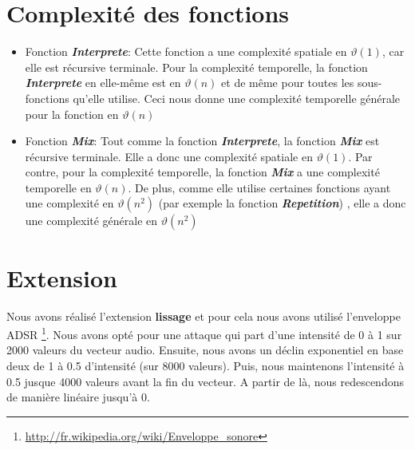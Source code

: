 \documentclass[a4paper,12pt]{report}
\begin{document}
\section*{Complexité des fonctions}
\begin{itemize}


\item Fonction \textit{\textbf{Interprete}}: Cette fonction a une complexité spatiale en $\vartheta(1)$, car elle est récursive terminale.
Pour la complexité temporelle, la fonction \textit{\textbf {Interprete}} en elle-même est en  $\vartheta(n)$ et de même pour toutes les sous-fonctions qu'elle utilise. Ceci nous donne une complexité temporelle  générale pour la fonction en  $\vartheta(n)$
\item Fonction \textit{\textbf{Mix}}: Tout comme la fonction \textit{\textbf{Interprete}}, la fonction \textit{\textbf{Mix}} est récursive terminale. Elle a donc une complexité spatiale en  $\vartheta(1)$. Par contre, pour la complexité temporelle, la fonction \textit{\textbf{Mix}} a une complexité temporelle en  $\vartheta(n)$. De plus, comme elle utilise certaines fonctions ayant une complexité en  $\vartheta(n^2)$ (par exemple la fonction \textit{\textbf{Repetition}}) , elle a donc une complexité générale en  $\vartheta(n^2)$

\end{itemize} 


\section*{Extension}
Nous avons réalisé l'extension {\large \textbf{lissage}} et pour cela nous avons utilisé l'enveloppe ADSR \footnote{\url{http://fr.wikipedia.org/wiki/Enveloppe_sonore}}. Nous avons opté pour une attaque qui part d'une intensité de 0 à 1 sur 2000 valeurs du vecteur audio. Ensuite, nous avons un déclin exponentiel en base deux de 1 à 0.5 d'intensité (sur 8000 valeurs). Puis, nous maintenons l'intensité à 0.5 jusque 4000 valeurs avant la fin du vecteur. A partir de là, nous redescendons de manière linéaire jusqu'à 0.
\end{document}

